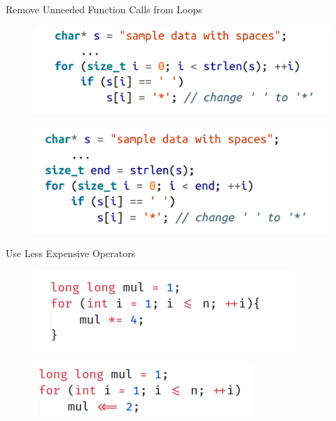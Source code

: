 \documentclass[aspectratio=169,xcolor=dvipsnames]{beamer}
\begin{document}
\begin{frame}{Remove Unneeded Function Calls from Loops}
    \begin{figure}
        \centering
        \includegraphics[scale = 0.9]{unneeded_function_1.png}
        \label{fig:my_label}
    \end{figure}
    \begin{figure}
        \centering
        \includegraphics[scale = 0.9]{unneeded_function_2.png}
        \label{fig:my_label}
    \end{figure}
\end{frame}

\begin{frame}{Use Less Expensive Operators}
     \begin{figure}
        \centering
        \includegraphics[scale = 0.7]{optimize_hot_statements_mul.png}
        \label{fig:my_label}
    \end{figure}
    \begin{figure}
        \centering
        \includegraphics[scale = 0.7]{optimize_hot_statements_shift.png}
        \label{fig:my_label}
    \end{figure}
\end{frame}
\end{document}
